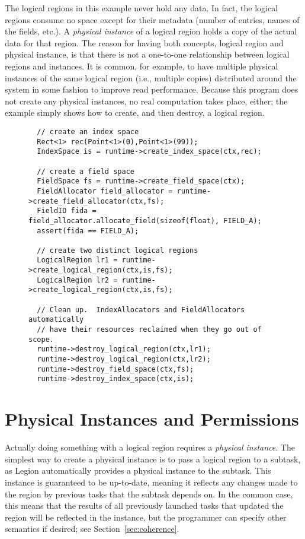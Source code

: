 The logical regions in this example never hold any data.  In
fact, the logical regions consume no space except for their metadata
(number of entries, names of the fields, etc.).  A {\em physical
  instance} of a logical region holds a copy of the actual data for
that region.  The reason for having both concepts, logical region and
physical instance, is that there is not a one-to-one relationship
between logical regions and instances.  It is common, for example, to
have multiple physical instances of the same logical region (i.e.,
multiple copies) distributed around the system in some fashion to
improve read performance.  Because this program does not create any
physical instances, no real computation takes place, either; the
example simply shows how to create, and then destroy, a logical
region.

\begin{figure}
{\small
\begin{lstlisting}
  // create an index space
  Rect<1> rec(Point<1>(0),Point<1>(99));
  IndexSpace is = runtime->create_index_space(ctx,rec);

  // create a field space  
  FieldSpace fs = runtime->create_field_space(ctx);
  FieldAllocator field_allocator = runtime->create_field_allocator(ctx,fs);
  FieldID fida = field_allocator.allocate_field(sizeof(float), FIELD_A);
  assert(fida == FIELD_A);

  // create two distinct logical regions   
  LogicalRegion lr1 = runtime->create_logical_region(ctx,is,fs);
  LogicalRegion lr2 = runtime->create_logical_region(ctx,is,fs);

  // Clean up.  IndexAllocators and FieldAllocators automatically
  // have their resources reclaimed when they go out of scope.
  runtime->destroy_logical_region(ctx,lr1);
  runtime->destroy_logical_region(ctx,lr2);
  runtime->destroy_field_space(ctx,fs);
  runtime->destroy_index_space(ctx,is);
\end{lstlisting}
}
\caption{}
\label{fig:lr1}
\end{figure}

\section{Physical Instances and Permissions}
\label{sec:permissions}

Actually doing something with a logical region requires a {\em
  physical instance}.  The simplest way to create a physical instance
is to pass a logical region to a subtask, as Legion automatically
provides a physical instance to the subtask.  This instance is
guaranteed to be up-to-date, meaning it reflects any changes made to
the region by previous tasks that the subtask depends on.  In the
common case, this means that the results of all previously launched
tasks that updated the region will be reflected in the instance, but
the programmer can specify other semantics if desired; see
Section~\ref{sec:coherence}.

